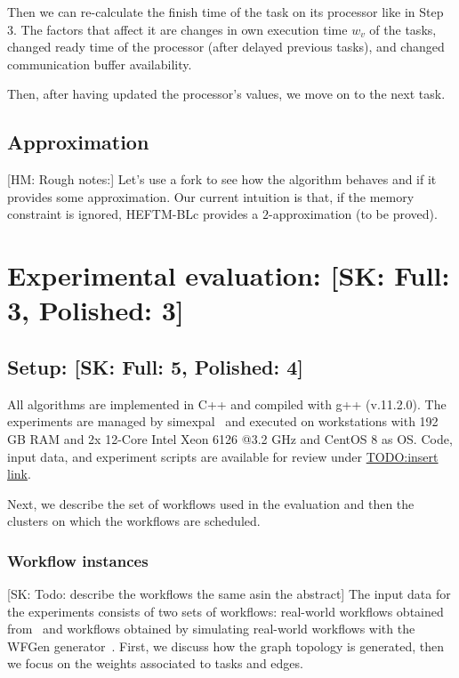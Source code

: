 \documentclass[conference]{IEEEtran}
\newcommand{\skug}[1]{{\color{blue}[SK: #1]}}
\newcommand{\hmey}[1]{{\color{red}[HM: #1]}}
\begin{document}
    Then we can re-calculate the finish time of the task on its processor like in Step 3.
    The factors that affect it are changes in own execution time $w_v$ of the tasks, changed ready time of the processor
    (after delayed previous tasks), and changed communication buffer availability.

    Then, after having updated the processor's values, we move on to the next task.


    \subsection{Approximation}
    \hmey{Rough notes:}
    Let's use a fork to see how the algorithm behaves and if it provides some approximation. Our current intuition is that, if the memory constraint is ignored, HEFTM-BLc provides a $2$-approximation (to be proved).

    \section{Experimental evaluation: \skug{Full: 3, Polished: 3}}
    \subsection{Setup: \skug{Full: 5, Polished: 4}}
    \label{sec:setup}

    All algorithms are implemented in C++ and compiled with g++ (v.11.2.0).
    The experiments are managed by simexpal~\cite{DBLP:journals/algorithms/AngrimanGLMNPT19} and executed on workstations with 192 GB RAM and 2x 12-Core Intel Xeon 6126 @3.2 GHz
    and CentOS 8 as OS.
    Code, input data, and experiment scripts are available for review under \url{TODO:insert link}.

    Next, we describe the set of workflows used in the evaluation and then the clusters on which the
    workflows are scheduled.

    \subsubsection{Workflow instances}
    \skug{Todo: describe the workflows the same asin the abstract}
    The input data for the experiments consists of two sets of workflows: real-world workflows
    obtained from~\cite{ewels2020nf} and workflows obtained by simulating real-world workflows
    with the WFGen generator~\cite{COLEMAN202216}.
    First, we discuss how the graph topology is generated,
    then we focus on the weights associated to tasks and edges.
\end{document}
